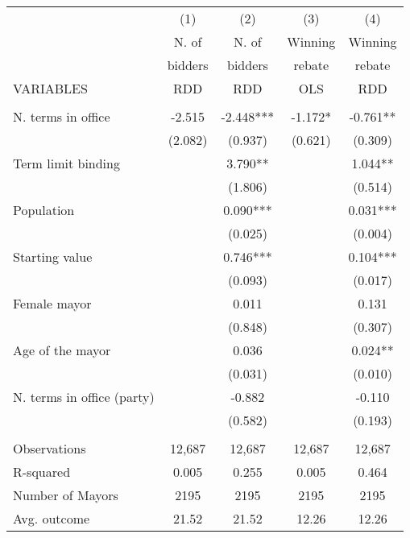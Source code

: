 \documentclass[]{article}
\begin{document}
\begin{tabular}{lcccc} \hline
 & (1) & (2) & (3) & (4) \\
 & N. of & N. of & Winning & Winning \\
 & bidders & bidders & rebate & rebate \\
VARIABLES & RDD & RDD & OLS & RDD \\ \hline
 &  &  &  &  \\
N. terms in office & -2.515 & -2.448*** & -1.172* & -0.761** \\
 & (2.082) & (0.937) & (0.621) & (0.309) \\
Term limit binding &  & 3.790** &  & 1.044** \\
 &  & (1.806) &  & (0.514) \\
Population &  & 0.090*** &  & 0.031*** \\
 &  & (0.025) &  & (0.004) \\
Starting value &  & 0.746*** &  & 0.104*** \\
 &  & (0.093) &  & (0.017) \\
Female mayor &  & 0.011 &  & 0.131 \\
 &  & (0.848) &  & (0.307) \\
Age of the mayor &  & 0.036 &  & 0.024** \\
 &  & (0.031) &  & (0.010) \\
N. terms in office (party) &  & -0.882 &  & -0.110 \\
 &  & (0.582) &  & (0.193) \\
 &  &  &  &  \\
Observations & 12,687 & 12,687 & 12,687 & 12,687 \\
R-squared & 0.005 & 0.255 & 0.005 & 0.464 \\
Number of Mayors & 2195 & 2195 & 2195 & 2195 \\
 Avg. outcome & 21.52 & 21.52 & 12.26 & 12.26 \\ \hline
\end{tabular}
\end{document}
